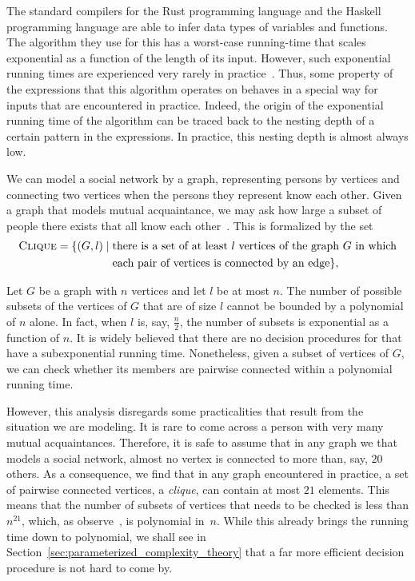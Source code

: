\begin{example}
\label{ex:type_inference}%
  The standard compilers for the Rust programming language and the Haskell programming language are able to infer data types of variables and functions.
  The algorithm they use for this has a worst-case running-time that scales exponential as a function of the length of its input.
  However, such exponential running times are experienced very rarely in practice~\parencite{kanellakis1989polymorphic}.
  Thus, some property of the expressions that this algorithm operates on behaves in a special way for inputs that are encountered in practice.
  Indeed, the origin of the exponential running time of the algorithm can be traced back to the nesting depth of a certain pattern in the expressions.
  In practice, this nesting depth is almost always low.
\end{example}

\begin{example}
\label{ex:clique}%
  We can model a social network by a graph, representing persons by vertices and connecting two vertices when the persons they represent know each other.
  Given a graph that models mutual acquaintance, we may ask how large a subset of people there exists that all know each other~\parencite[a \emph{clique}, see][]{diestel2017graph}.
  This is formalized by the set
  \begin{align*}
    \defkeyat{Clique@\pr{Clique}}{\pr{Clique}} \deq \{(G, l) \st &\text{there is a set of at least $l$ vertices of the graph~$G$ in which} \\
    	&\text{each pair of vertices is connected by an edge}\},
  \end{align*}

  Let $G$ be a graph with $n$ vertices and let $l$ be at most $n$.
  The number of possible subsets of the vertices of $G$ that are of size $l$ cannot be bounded by a polynomial of $n$ alone.
  In fact, when $l$ is, say, $\frac{n}{2}$, the number of subsets is exponential as a function of $n$.
  It is widely believed that there are no decision procedures for  that have a subexponential running time.
  Nonetheless, given a subset of vertices of $G$, we can check whether its members are pairwise connected within a polynomial running time.

  However, this analysis disregards some practicalities that result from the situation we are modeling.
  It is rare to come across a person with very many mutual acquaintances.
  Therefore, it is safe to assume that in any graph we that models a social network, almost no vertex is connected to more than, say, $20$ others.
  As a consequence, we find that in any graph encountered in practice, a set of pairwise connected vertices, a \emph{clique}, can contain at most $21$ elements.
  This means that the number of subsets of vertices that needs to be checked is less than $n^{21}$, which, as \citeauthor{garey1979computers} observe~\parencite[Section~4.1]{garey1979computers}, is polynomial in~$n$.
  While this already brings the running time down to polynomial, we shall see in Section~\ref{sec:parameterized_complexity_theory} that a far more efficient decision procedure is not hard to come by.
\end{example}

